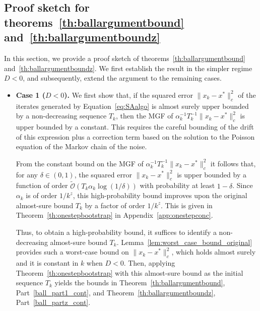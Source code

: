 \documentclass{article}
\begin{document}
\subsection{Proof sketch for theorems~\ref{th:ballargumentbound} and~\ref{th:ballargumentboundz}}\label{sec:proof_sketch_12}
In this section, we provide a proof sketch of theorems~\ref{th:ballargumentbound} and~\ref{th:ballargumentboundz}. We first establish the result in the simpler regime $D < 0$, and subsequently, extend the argument to the remaining cases.

\begin{itemize}
    \item {\bf Case 1 ($D < 0$).}  We first show that, if the squared error $\|x_k-x^*\|^2_c$ of the iterates generated by Equation~\eqref{eq:SAalgo} is almost surely upper bounded by a non-decreasing sequence $T_k$, then the MGF of $\alpha_k^{-1}T_k^{-1} \|x_k-x^*\|^2_c$ is upper bounded by a constant. This requires the careful bounding of the drift of this expression plus a correction term based on the solution to the Poisson equation of the Markov chain of the noise. 
    
    From the constant bound on the MGF of $\alpha_k^{-1}T_k^{-1} \|x_k-x^*\|^2_c$ it follows that, for any $\delta \in (0,1)$, the squared error $\|x_k-x^*\|^2_c$ is upper bounded by a function of order $\tilde{\mathcal{O}}(T_k\alpha_k\log(1/\delta))$ with probability at least $1-\delta$. Since $\alpha_k$ is of order $1/k^z$, this high-probability bound improves upon the original almost-sure bound $T_k$ by a factor of order $1/k^{z}$. This is given in Theorem~\ref{th:onestepbootstrap} in Appendix~\ref{app:onestepconc}. 
    
    Thus, to obtain a high-probability bound, it suffices to identify a non-decreasing almost-sure bound $T_k$. Lemma~\ref{lem:worst_case_bound_original} provides such a worst-case bound on $\|x_k-x^*\|^2_c$, which holds almost surely and it is constant in $k$ when $D < 0$. %
    Then, applying Theorem~\ref{th:onestepbootstrap} with this almost-sure bound as the initial sequence $T_k$ yields the bounds in Theorem~\ref{th:ballargumentbound}, Part~\ref{ball_part1_cont}, and Theorem~\ref{th:ballargumentboundz}, Part~\ref{ball_partz_cont}. 


\end{itemize}
\end{document}
